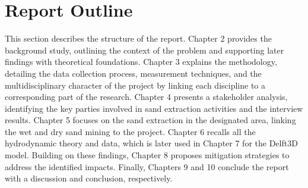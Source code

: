 \section{Report Outline}
\label{section: report outline}
This section describes the structure of the report. Chapter 2 provides the background study, outlining the context of the problem and supporting later findings with theoretical foundations. Chapter 3 explains the methodology, detailing the data collection process, measurement techniques, and the multidisciplinary character of the project by linking each discipline to a corresponding part of the research. Chapter 4 presents a stakeholder analysis, identifying the key parties involved in sand extraction activities and the interview results. Chapter 5 focuses on the sand extraction in the designated area, linking the wet and dry sand mining to the project. Chapter 6 recalls all the hydrodynamic theory and data, which is later used in Chapter 7 for the Delft3D model. Building on these findings, Chapter 8 proposes mitigation strategies to address the identified impacts. Finally, Chapters 9 and 10 conclude the report with a discussion and conclusion, respectively.


